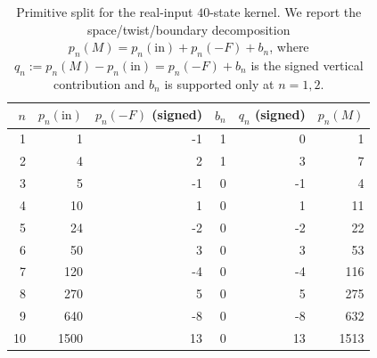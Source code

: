\begin{table}[H]
\centering
\scriptsize
\setlength{\tabcolsep}{5pt}
\caption{Primitive split for the real-input $40$-state kernel. We report the space/twist/boundary decomposition $p_n(M)=p_n(\mathrm{in})+p_n(-F)+b_n$, where $q_n:=p_n(M)-p_n(\mathrm{in})=p_n(-F)+b_n$ is the signed vertical contribution and $b_n$ is supported only at $n=1,2$.}
\label{tab:real_input_40_primitive_artin_split}
\begin{tabular}{r r r r r r}
\toprule
$n$ & $p_n(\mathrm{in})$ & $p_n(-F)$ (signed) & $b_n$ & $q_n$ (signed) & $p_n(M)$\\
\midrule
1 & 1 & -1 & 1 & 0 & 1\\
2 & 4 & 2 & 1 & 3 & 7\\
3 & 5 & -1 & 0 & -1 & 4\\
4 & 10 & 1 & 0 & 1 & 11\\
5 & 24 & -2 & 0 & -2 & 22\\
6 & 50 & 3 & 0 & 3 & 53\\
7 & 120 & -4 & 0 & -4 & 116\\
8 & 270 & 5 & 0 & 5 & 275\\
9 & 640 & -8 & 0 & -8 & 632\\
10 & 1500 & 13 & 0 & 13 & 1513\\
\bottomrule
\end{tabular}
\end{table}
